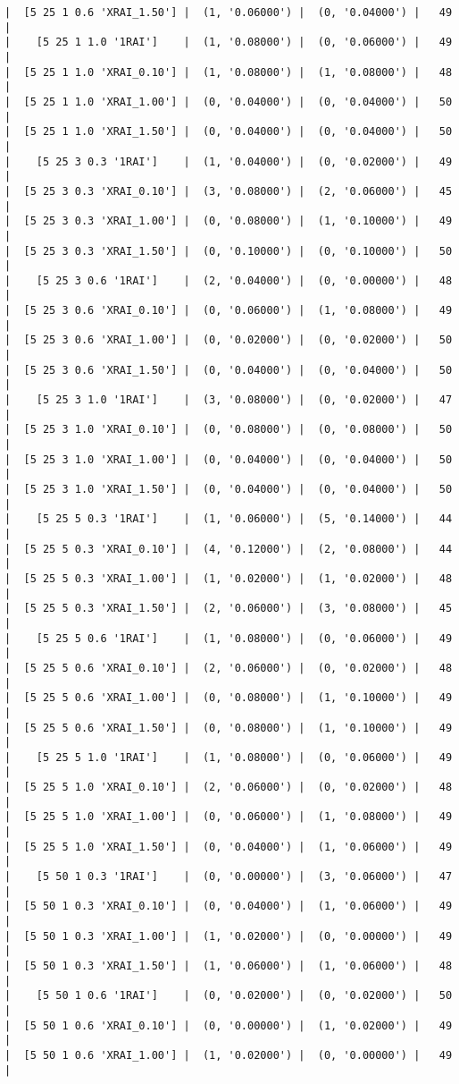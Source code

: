 \documentclass{article}
\begin{document}
\begin{verbatim}
|  [5 25 1 0.6 'XRAI_1.50'] |  (1, '0.06000') |  (0, '0.04000') |   49  |
|    [5 25 1 1.0 '1RAI']    |  (1, '0.08000') |  (0, '0.06000') |   49  |
|  [5 25 1 1.0 'XRAI_0.10'] |  (1, '0.08000') |  (1, '0.08000') |   48  |
|  [5 25 1 1.0 'XRAI_1.00'] |  (0, '0.04000') |  (0, '0.04000') |   50  |
|  [5 25 1 1.0 'XRAI_1.50'] |  (0, '0.04000') |  (0, '0.04000') |   50  |
|    [5 25 3 0.3 '1RAI']    |  (1, '0.04000') |  (0, '0.02000') |   49  |
|  [5 25 3 0.3 'XRAI_0.10'] |  (3, '0.08000') |  (2, '0.06000') |   45  |
|  [5 25 3 0.3 'XRAI_1.00'] |  (0, '0.08000') |  (1, '0.10000') |   49  |
|  [5 25 3 0.3 'XRAI_1.50'] |  (0, '0.10000') |  (0, '0.10000') |   50  |
|    [5 25 3 0.6 '1RAI']    |  (2, '0.04000') |  (0, '0.00000') |   48  |
|  [5 25 3 0.6 'XRAI_0.10'] |  (0, '0.06000') |  (1, '0.08000') |   49  |
|  [5 25 3 0.6 'XRAI_1.00'] |  (0, '0.02000') |  (0, '0.02000') |   50  |
|  [5 25 3 0.6 'XRAI_1.50'] |  (0, '0.04000') |  (0, '0.04000') |   50  |
|    [5 25 3 1.0 '1RAI']    |  (3, '0.08000') |  (0, '0.02000') |   47  |
|  [5 25 3 1.0 'XRAI_0.10'] |  (0, '0.08000') |  (0, '0.08000') |   50  |
|  [5 25 3 1.0 'XRAI_1.00'] |  (0, '0.04000') |  (0, '0.04000') |   50  |
|  [5 25 3 1.0 'XRAI_1.50'] |  (0, '0.04000') |  (0, '0.04000') |   50  |
|    [5 25 5 0.3 '1RAI']    |  (1, '0.06000') |  (5, '0.14000') |   44  |
|  [5 25 5 0.3 'XRAI_0.10'] |  (4, '0.12000') |  (2, '0.08000') |   44  |
|  [5 25 5 0.3 'XRAI_1.00'] |  (1, '0.02000') |  (1, '0.02000') |   48  |
|  [5 25 5 0.3 'XRAI_1.50'] |  (2, '0.06000') |  (3, '0.08000') |   45  |
|    [5 25 5 0.6 '1RAI']    |  (1, '0.08000') |  (0, '0.06000') |   49  |
|  [5 25 5 0.6 'XRAI_0.10'] |  (2, '0.06000') |  (0, '0.02000') |   48  |
|  [5 25 5 0.6 'XRAI_1.00'] |  (0, '0.08000') |  (1, '0.10000') |   49  |
|  [5 25 5 0.6 'XRAI_1.50'] |  (0, '0.08000') |  (1, '0.10000') |   49  |
|    [5 25 5 1.0 '1RAI']    |  (1, '0.08000') |  (0, '0.06000') |   49  |
|  [5 25 5 1.0 'XRAI_0.10'] |  (2, '0.06000') |  (0, '0.02000') |   48  |
|  [5 25 5 1.0 'XRAI_1.00'] |  (0, '0.06000') |  (1, '0.08000') |   49  |
|  [5 25 5 1.0 'XRAI_1.50'] |  (0, '0.04000') |  (1, '0.06000') |   49  |
|    [5 50 1 0.3 '1RAI']    |  (0, '0.00000') |  (3, '0.06000') |   47  |
|  [5 50 1 0.3 'XRAI_0.10'] |  (0, '0.04000') |  (1, '0.06000') |   49  |
|  [5 50 1 0.3 'XRAI_1.00'] |  (1, '0.02000') |  (0, '0.00000') |   49  |
|  [5 50 1 0.3 'XRAI_1.50'] |  (1, '0.06000') |  (1, '0.06000') |   48  |
|    [5 50 1 0.6 '1RAI']    |  (0, '0.02000') |  (0, '0.02000') |   50  |
|  [5 50 1 0.6 'XRAI_0.10'] |  (0, '0.00000') |  (1, '0.02000') |   49  |
|  [5 50 1 0.6 'XRAI_1.00'] |  (1, '0.02000') |  (0, '0.00000') |   49  |

\end{verbatim}
\end{document}
